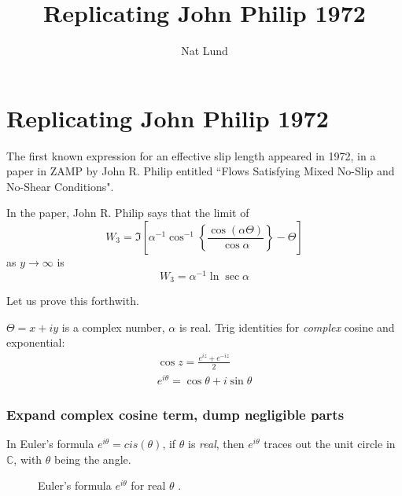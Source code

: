 \documentclass[12pt, a4paper, twoside, openright]{book}
\title{Replicating John Philip 1972}
\author{Nat Lund}
\begin{document}
\chapter{Replicating John Philip 1972}

The first known expression for an effective slip length appeared in 1972, in a paper in ZAMP by John R. Philip entitled ``Flows Satisfying Mixed No-Slip and No-Shear Conditions".

In the paper, John R. Philip says that the limit of
\begin{equation}
W_{3} = \Im \left[  
 \alpha^{-1} \cos^{-1} 
 \left\{ \frac{\cos(\alpha \Theta)}{\cos \alpha} \right\} - \Theta
   \right]
\end{equation}
as $y\rightarrow \infty$ is
\begin{equation}
W_{3} = \alpha^{-1} \ln \sec \alpha
\end{equation}

Let us prove this forthwith.
\vspace*{1em}

$\Theta = x + iy$ is a complex number, $\alpha$ is real.  Trig identities for \emph{complex} cosine and exponential:
\begin{gather}
\cos z = \frac{e^{iz}+e^{-iz}}{2} \\
e^{i \theta} = \cos \theta + i \sin \theta 
\end{gather}

\clearpage
\subsection*{Expand complex cosine term, dump negligible parts}

In Euler's formula $e^{i\theta} = cis(\theta)$, if $\theta$ is \emph{real}, then $e^{i \theta}$ traces out the unit circle in $\mathbb{C}$, with $\theta$ being the angle.

\begin{figure}[h]
\centering
{}
\caption{Euler's formula $e^{i \theta}$ for real $\theta$ .}
\end{figure}
\end{document}
